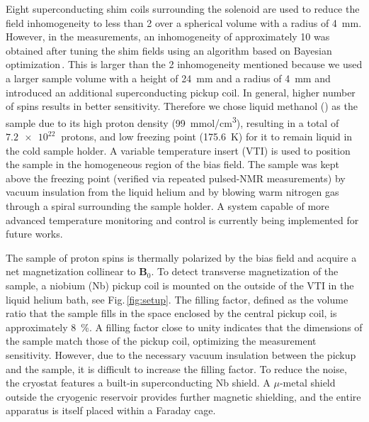 \documentclass[superscriptaddress,
floatfix,
reprint,
nofootinbib,
amsmath,amssymb,
aps,
prd,
]{revtex4-2}
\begin{document}
Eight superconducting shim coils surrounding the solenoid are used to reduce the field inhomogeneity to less than \SI{2}{\ppm} over a spherical volume with a radius of \SI{4}{\mm}. However, in the measurements, an inhomogeneity of approximately \SI{10}{\ppm} was obtained after tuning the shim fields using an algorithm based on Bayesian optimization\,\cite{ShimmingPaper}. This is larger than the \SI{2}{\ppm} inhomogeneity mentioned because we used a larger sample volume with a height of \SI{24}{\mm} and a radius of \SI{4}{\mm} and introduced an additional superconducting pickup coil. 
In general, higher number of spins results in better sensitivity. Therefore we chose liquid methanol () as the sample due to its high proton density (\SI{99}{\mmol/\cm^3}), resulting in a total of $\SI{7.2e22}{}$ protons, and low freezing point (\SI{175.6}{\kelvin}) for it to remain liquid in the cold sample holder.
A variable temperature insert (VTI) is used to position the sample in the homogeneous region of the bias field. 
The sample was kept above the freezing point (verified via repeated pulsed-NMR measurements) by vacuum insulation from the liquid helium and by blowing warm nitrogen gas through a spiral surrounding the sample holder. 
A system capable of more advanced temperature monitoring and control is currently being implemented for future works.

The sample of proton spins is thermally polarized by the bias field and acquire a net magnetization collinear to $\mathbf{B}_0$. 
To detect transverse magnetization of the sample, a niobium (Nb) pickup coil is mounted on the outside of the VTI in the liquid helium bath, see Fig.\,\ref{fig:setup}.  
The filling factor, defined as the volume ratio that the sample fills in the space enclosed by the central pickup coil, is approximately \SI{8}{\%}. 
A filling factor close to unity indicates that the dimensions of the sample match those of the pickup coil, optimizing the measurement sensitivity. 
However, due to the necessary vacuum insulation between the pickup and the sample, it is difficult to increase the filling factor. 
To reduce the noise, the cryostat features a built-in superconducting Nb shield.
A $\mu$-metal shield outside the cryogenic reservoir provides further magnetic shielding, and the entire apparatus is itself placed within a Faraday cage.
\end{document}
